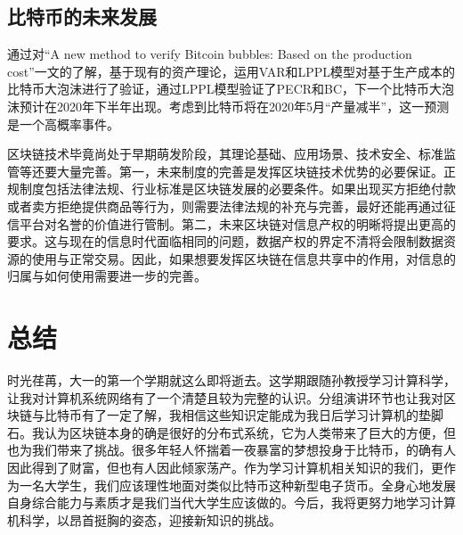 \documentclass{article}
\begin{document}
\subsection{比特币的未来发展}
通过对“A new method to verify Bitcoin bubbles: Based on the production cost”一文的了解，基于现有的资产理论，运用VAR和LPPL模型对基于生产成本的比特币大泡沫进行了验证，通过LPPL模型验证了PECR和BC，下一个比特币大泡沫预计在2020年下半年出现。考虑到比特币将在2020年5月“产量减半”，这一预测是一个高概率事件\citep{jinwuxiong}。\par
区块链技术毕竟尚处于早期萌发阶段，其理论基础、应用场景、技术安全、标准监管等还要大量完善。第一，未来制度的完善是发挥区块链技术优势的必要保证。正规制度包括法律法规、行业标准是区块链发展的必要条件。如果出现买方拒绝付款或者卖方拒绝提供商品等行为，则需要法律法规的补充与完善，最好还能再通过征信平台对名誉的价值进行管制。第二，未来区块链对信息产权的明晰将提出更高的要求。这与现在的信息时代面临相同的问题，数据产权的界定不清将会限制数据资源的使用与正常交易。因此，如果想要发挥区块链在信息共享中的作用，对信息的归属与如何使用需要进一步的完善\citep{liuyanghe}。\par
\section{总结}
时光荏苒，大一的第一个学期就这么即将逝去。这学期跟随孙教授学习计算科学，让我对计算机系统网络有了一个清楚且较为完整的认识。分组演讲环节也让我对区块链与比特币有了一定了解，我相信这些知识定能成为我日后学习计算机的垫脚石。我认为区块链本身的确是很好的分布式系统，它为人类带来了巨大的方便，但也为我们带来了挑战。很多年轻人怀揣着一夜暴富的梦想投身于比特币，的确有人因此得到了财富，但也有人因此倾家荡产。作为学习计算机相关知识的我们，更作为一名大学生，我们应该理性地面对类似比特币这种新型电子货币。全身心地发展自身综合能力与素质才是我们当代大学生应该做的。今后，我将更努力地学习计算机科学，以昂首挺胸的姿态，迎接新知识的挑战。\par
\end{document}
